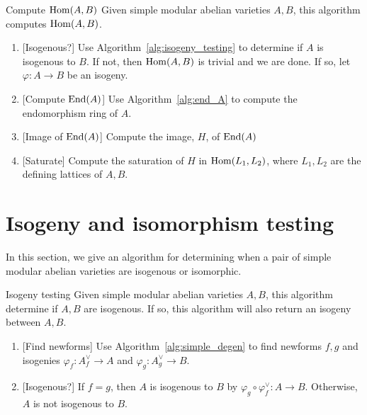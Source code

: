 \begin{algorithm}{Compute $\operatorname{Hom}(A,B)$}
    \label{alg:hom_AB}
    Given simple modular abelian varieties $A, B$, this algorithm computes
    $\operatorname{Hom}(A,B)$.
    \begin{enumerate}
        \item{} [Isogenous?]
            Use Algorithm~\ref{alg:isogeny_testing} to determine if $A$ is isogenous
            to $B$. If not, then $\operatorname{Hom}(A,B)$ is trivial and we are done. If so,
            let $\varphi:A\to B$ be an isogeny.
        \item{} [Compute $\operatorname{End}(A)$]
            Use Algorithm~\ref{alg:end_A} to compute the endomorphism ring of
            $A$.
        \item{} [Image of $\operatorname{End}(A)$]
            Compute the image, $H$, of $\operatorname{End}(A)$
        \item{} [Saturate]
            Compute the saturation of $H$ in $\operatorname{Hom}(L_1, L_2)$, where $L_1, L_2$
            are the defining lattices of $A,B$.
    \end{enumerate}
\end{algorithm}


\section{Isogeny and isomorphism testing}

In this section, we give an algorithm for determining when a pair of simple
modular abelian varieties are isogenous or isomorphic.

\begin{algorithm}{Isogeny testing}%
    \label{alg:isogeny_testing}
    Given simple modular abelian varieties $A, B$, this algorithm determine if
    $A, B$ are isogenous. If so, this algorithm will also return an
    isogeny between $A, B$.
    \begin{enumerate}
        \item{} [Find newforms]
            Use Algorithm~\ref{alg:simple_degen} to find newforms $f,g$ and
            isogenies $\varphi_f:A_f ^\vee \to A$ and $\varphi_g:A_g ^\vee\to
            B$.
        \item{} [Isogenous?]
            If $f=g$, then $A$ is isogenous to $B$ by $\varphi_g \circ
            \varphi_f ^\vee:A\to B$. Otherwise, $A$ is not isogenous to $B$.
    \end{enumerate}
\end{algorithm}

